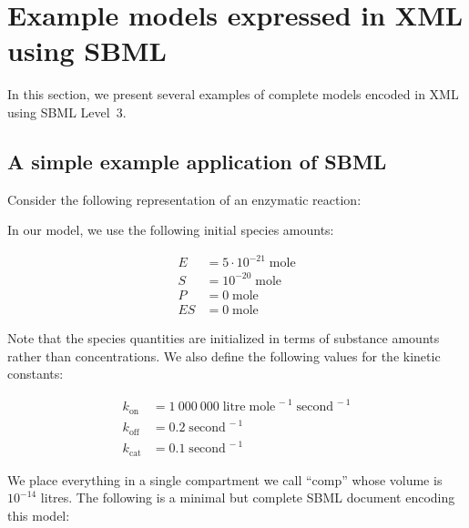

\newcommand{\species}[1]{\ensuremath{#1}\xspace}
\newcommand{\concent}[1]{\ensuremath{[#1\mkern1mu]}\xspace}
\newcommand{\unit}[1]   {\text{#1}\xspace}


\section{Example models expressed in XML using SBML}
\label{sec:xml-rep}
\label{sec:examples}

In this section, we present several examples of complete models
encoded in XML using SBML Level~3.


\subsection{A simple example application of SBML}
\label{sec:modeleg}

\newcommand{\kon} {\ensuremath{k_\text{on}}\xspace}
\newcommand{\koff}{\ensuremath{k_\text{off}}\xspace}
\newcommand{\kcat}{\ensuremath{k_\text{cat}}\xspace}

Consider the following representation of an enzymatic reaction:
\begin{center}
  \ce{\species{E} + \species{S} <=>[\kon][\koff] \species{ES} ->[\kcat] \species{E} + \species{P}}
\end{center}
In our model, we use the following initial species amounts:
\begin{linenomath}
  \begin{align*}
    \species{E}  &= 5 \cdot 10^{-21}\; \unit{mole} \\
    \species{S}  &= 10^{-20}\; \unit{mole} \\
    \species{P}  &= 0\; \unit{mole} \\
    \species{ES} &= 0\; \unit{mole}
  \end{align*}
\end{linenomath}
Note that the species quantities are initialized in terms of
substance amounts rather than concentrations.  We also define the
following values for the kinetic constants:
\begin{linenomath}
  \begin{align*}
    \kon         &= 1\:000\:000 \; \unit{litre} \; \unit{mole}^{\,-1} \; \unit{second}^{\,-1}\\
    \koff        &= 0.2 \; \unit{second}^{\,-1}\\
    \kcat        &= 0.1 \; \unit{second}^{\,-1}
  \end{align*}
\end{linenomath}
We place everything in a single compartment we call ``comp'' whose
volume is $10^{-14}$ litres.  The following is a minimal but
complete SBML document encoding this model:

